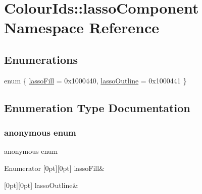 \hypertarget{namespaceColourIds_1_1lassoComponent}{}\section{Colour\+Ids\+:\+:lasso\+Component Namespace Reference}
\label{namespaceColourIds_1_1lassoComponent}
\subsection*{Enumerations}
\begin{DoxyCompactItemize}
\item 
enum \{ \mbox{\hyperlink{namespaceColourIds_1_1lassoComponent_a23e2817647698025b79827354d02614ea7bb8387fdbaf5efabbbc64983cbf2ed6}{lasso\+Fill}} = 0x1000440, 
\mbox{\hyperlink{namespaceColourIds_1_1lassoComponent_a23e2817647698025b79827354d02614eabc0519c32ea040ffcfcaa8d9516471c7}{lasso\+Outline}} = 0x1000441
 \}
\end{DoxyCompactItemize}


\subsection{Enumeration Type Documentation}
\mbox{\label{namespaceColourIds_1_1lassoComponent_a23e2817647698025b79827354d02614e}} 
\subsubsection{\texorpdfstring{anonymous enum}{anonymous enum}}
{\footnotesize\ttfamily anonymous enum}

\begin{DoxyEnumFields}{Enumerator}
[0pt][0pt]{}\mbox{\label{namespaceColourIds_1_1lassoComponent_a23e2817647698025b79827354d02614ea7bb8387fdbaf5efabbbc64983cbf2ed6}} 
lasso\+Fill&\\
\hline

[0pt][0pt]{}\mbox{\label{namespaceColourIds_1_1lassoComponent_a23e2817647698025b79827354d02614eabc0519c32ea040ffcfcaa8d9516471c7}} 
lasso\+Outline&\\
\hline

\end{DoxyEnumFields}
